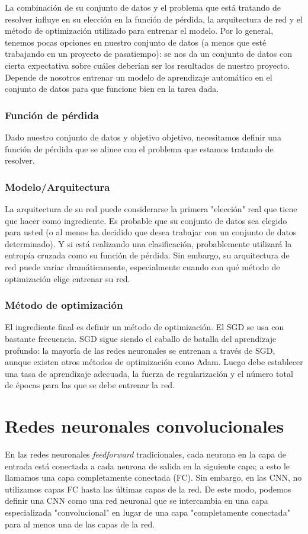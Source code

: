 \documentclass[14.5pt,a4paper]{article}
\begin{document}
La combinación de su conjunto de datos y el problema que está tratando de resolver influye en su elección en la función de pérdida, la arquitectura de red y el método de optimización utilizado para entrenar el modelo. Por lo general, tenemos pocas opciones en nuestro conjunto de datos (a menos que esté trabajando en un proyecto de pasatiempo): se nos da un conjunto de datos con cierta expectativa sobre cuáles deberían ser los resultados de nuestro proyecto. Depende de nosotros entrenar un modelo de aprendizaje automático en el conjunto de datos para que funcione bien en la tarea dada.

\subsubsection{Función de pérdida}
Dado nuestro conjunto de datos y objetivo objetivo, necesitamos definir una función de pérdida que se alinee con el problema que estamos tratando de resolver.

\subsubsection{Modelo/Arquitectura}
La arquitectura de su red puede considerarse la primera "elección" real que tiene que hacer como ingrediente. Es probable que su conjunto de datos sea elegido para usted (o al menos ha decidido que desea trabajar con un conjunto de datos determinado). Y si está realizando una clasificación, probablemente utilizará la entropía cruzada como su función de pérdida.
Sin embargo, su arquitectura de red puede variar dramáticamente, especialmente cuando con qué método de optimización elige entrenar su red.

\subsubsection{Método de optimización}
El ingrediente final es definir un método de optimización. El SGD se usa con bastante frecuencia.
SGD sigue siendo el caballo de batalla del aprendizaje profundo: la mayoría de las redes neuronales se entrenan a través de SGD, aunque existen otros métodos de optimización como Adam.
Luego debe establecer una tasa de aprendizaje adecuada, la fuerza de regularización y el número total de épocas para las que se debe entrenar la red.

\section{Redes neuronales convolucionales}
En las redes neuronales \textit{feedforward} tradicionales, cada neurona en la capa de entrada está conectada a cada neurona de salida en la siguiente capa; a esto le llamamos una capa completamente conectada (FC). Sin embargo, en las CNN, no utilizamos capas FC hasta las últimas capas de la red. De este modo, podemos definir una CNN como una red neuronal que se intercambia en una capa especializada "convolucional" en lugar de una capa "completamente conectada" para al menos una de las capas de la red.
\end{document}
